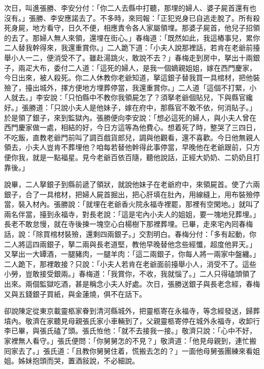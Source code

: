 次日，叫進張勝、李安分付：「你二人去縣中打聽，那埋的婦人、婆子屍首還有也沒有。」張勝、李安應諾去了。不多時，來囘報：「正犯兇身已自逃走脫了。所有殺死身屍，地方看守，日久不便，相應責令各人家屬領埋。那婆子屍首，他兒子招領的去了。那婦人無人來領，還埋在街心。」春梅道：「既然如此，我這樁事兒，累你二人替我幹得來，我還重賞你。」二人跪下道：「小夫人說那裡話，若肯在老爺前擡舉小人一二，便消受不了。雖赴湯跳火，敢說不去？」春梅走到房中，拏出十兩銀子，兩疋大布，委付二人道：「這死的婦人，是我一個嫡親姐姐，嫁在西門慶家，今日出來，被人殺死。你二人休教你老爺知道，拏這銀子替我買一具棺材，把他裝殮了，擡出城外，擇方便地方埋葬停當，我還重賞你。」二人道「這個不打緊，小人就去。」李安說：「只怕縣中不教你我領屍怎了？須拏老爺個貼兒，下與縣官纔好。」張勝道：「只說小夫人是他妹子，嫁在府中，那縣官不敢不依，何消貼子。」於是領了銀子，來到監獄內。張勝便向李安說：「想必這死的婦人，與小夫人曾在西門慶家做一處，相結的好，今日方這等為他費心。想着死了時，整哭了三四日，不吃飯，直教老爺門前叫了調百戲貨郎兒，調與他觀看，還不喜歡。今日他無親人領去，小夫人豈肯不葬埋他？咱每若替他幹得此事停當，早晚他在老爺跟前，只方便你我，就是一點福星。{}見今老爺百依百隨，聽他說話，正經大奶奶、二奶奶且打靠後。」

說畢，二人拏銀子到縣前遞了領狀，就說他妹子在老爺府中，來領屍首。使了六兩銀子，合了一具棺材，把婦人屍首掘出，把心肝填在肚內，用線縫上，用布裝殮停當，裝入材內。{}張勝說：「就埋在老爺香火院永福寺裡罷，那裡有空閑地。」就叫了兩名伴當，擡到永福寺，對長老說：「這是宅內小夫人的姐姐，要一塊地兒葬埋。」長老不敢怠慢，就在寺後揀一塊空心白楊樹下那裡葬埋。已畢，走來宅內囘春梅話，說：「除買棺材裝殮，還剩四兩銀子。」交割明白。春梅分付：「多有起動，你二人將這四兩銀子，拏二兩與長老道堅，教他早晚替他念些經懺，超度他昇天。」又拏出一大罈酒，一腿豬肉，一腿羊肉：「這二兩銀子，你每人將一兩家中盤纏。」二人跪下，那裡敢接？只說：「小夫人若肯在老爺面前擡舉小人，消受不了。這些小勞，豈敢接受銀兩。」春梅道：「我賞你，不收，我就惱了。」二人只得磕頭領了出來。兩個監獄吃酒，甚是稱念小夫人好處。{}次日，張勝送銀子與長老念經，春梅又與五錢銀子買紙，與金蓮燒，俱不在話下。

卻說陳定從東京載靈柩家眷到清河縣城外，把靈柩寄在永福寺，等念經發送，歸葬墳內。敬濟在家聽見母親張氏家小車輛到了，父親靈柩寄停在城外永福寺，收卸行李已畢，與張氏磕了頭。張氏恠他：「就不去接我一接。」{}敬濟只說：「心中不好，家裡無人看守。」張氏便問：「你舅舅怎的不見？」敬濟道：「他見母親到，連忙搬囘家去了。」張氏道：「且教你舅舅住着，慌搬去怎的？」一面他母舅張團練來看姐姐。姊妹抱頭而哭，置酒敍說，不必細說。

